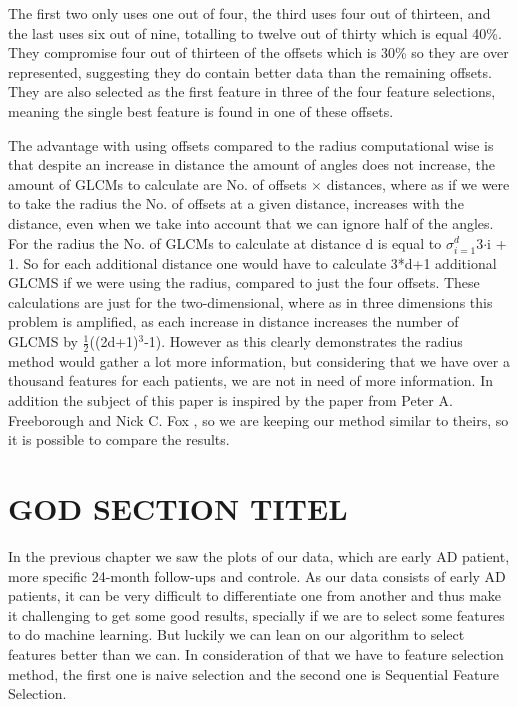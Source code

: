 The first two only uses one out of four, the third uses four out of thirteen, and the last uses six out of nine, totalling to twelve out of thirty which is equal 40\%. They compromise four out of thirteen of the offsets which is 30\% so they are  over represented, suggesting they do contain better data than the remaining offsets. They are also selected as the first feature in three of the four feature selections, meaning the single best feature is found in one of these offsets.




%


The advantage with using offsets compared to the radius computational wise is that despite an increase in distance the amount of angles does not increase, the amount of GLCMs to calculate are No. of offsets $\times$ distances, where as if we were to take the radius the No. of offsets at a given distance, increases with the distance, even when we take into account that we can ignore half of the angles. For  the radius the No. of GLCMs to calculate at distance d is equal to $\sigma_{i=1}^d$3$\cdot$i + 1. So for each additional distance one would have to calculate 3*d+1 additional GLCMS if we were using the radius, compared to just the four offsets. These calculations are just for the two-dimensional, where as in three dimensions this problem is amplified, as each increase in distance increases the number of GLCMS by $\frac{1}{2}$((2d+1)$^3$-1). However as this clearly demonstrates the radius method would gather a lot more information, but considering that we have over a thousand features for each patients, we are not in need of more information. In addition the subject of this paper is inspired by the paper from Peter A. Freeborough and Nick C. Fox \cite{MRfreeborough}, so we are keeping our method similar to theirs, so it  is possible to compare the results.

\section{GOD SECTION TITEL}
In the previous chapter we saw the plots of our data, which are early AD patient, more specific 24-month follow-ups and controle. As our data consists of early AD patients, it can be very difficult to differentiate one from another and thus make it challenging to get some good results, specially if we are to select some features to do machine learning. But luckily we can lean on our algorithm to select features better than we can. In consideration of that we have to feature selection method, the first one is naive selection and the second one is Sequential Feature Selection.


